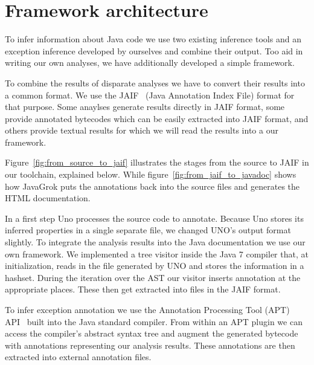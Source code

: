 \section{Framework architecture}

\begin{figure*}
\centering
{}
\caption{Toolchain from source to JAIF}
\label{fig:from_source_to_jaif}
\end{figure*}

To infer information about Java code we use two existing inference tools and 
an exception inference developed by ourselves and combine their output. 
Too aid in writing our own analyses, we have additionally developed a simple 
framework. 

To combine the results of disparate analyses we have to convert their results
into a common format.  We use the JAIF~\cite{JAIF}
(Java Annotation Index File) format for that purpose.  Some anaylses generate
results directly in JAIF format, some provide annotated bytecodes which can be
easily extracted into JAIF format, and others provide textual results for which
we will read the results into a our framework.

Figure~\ref{fig:from_source_to_jaif} 
illustrates the stages from the source to JAIF in our toolchain, explained 
below. While figure~\ref{fig:from_jaif_to_javadoc} shows how JavaGrok
puts the annotations back into the source files and generates the HTML
documentation.

\begin{figure*}
\centering
{}
\caption{From JAIF to Javadoc}
\label{fig:from_jaif_to_javadoc}
\end{figure*}

In a first step Uno processes the source code to annotate. 
Because Uno stores its inferred properties in a single separate file, 
we changed UNO's output format slightly.
To integrate the analysis results into the Java documentation we
use our own framework. We implemented a tree visitor inside the Java 7 
compiler that, at initialization, reads in the file generated by UNO and 
stores the information in a hashset. During the iteration over the AST
our visitor inserts annotation at the appropriate places. These then
get extracted into files in the JAIF format.

To infer exception annotation we use the Annotation Processing Tool (APT)
API~\cite{apt} built into the Java standard compiler.
From within an APT plugin
we can access the compiler's abstract syntax tree and augment the generated
bytecode with annotations representing our analysis results. These annotations
are then extracted into external annotation files.

